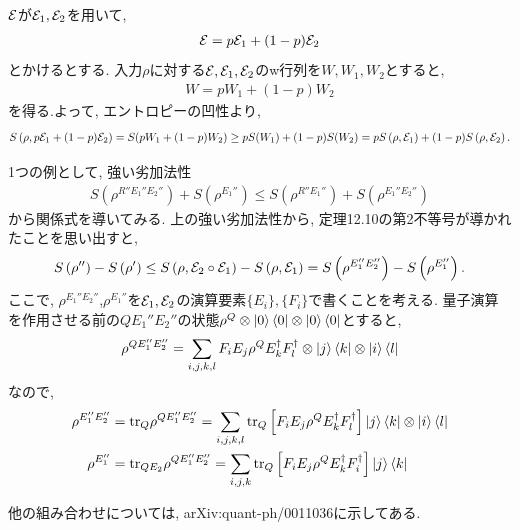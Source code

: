 \begin{ex}
    \label{ex12.12}
\end{ex}

\begin{ex}
    \label{ex12.13}
    $\mathcal{E}$が$\mathcal{E}_1, \mathcal{E}_2$を用いて,
    \begin{align*}
        \mathcal{E} = p \mathcal{E}_1 + ( 1 - p) \mathcal{E}_2
    \end{align*}
    とかけるとする. 入力$\rho$に対する$\mathcal{E}, \mathcal{E}_1, \mathcal{E}_2$のw行列を$W, W_1, W_2$とすると,
    \begin{align*}
        W = p W_1 + (1-p) W_2
    \end{align*}
    を得る.よって, エントロピーの凹性より,
    \begin{align*}
        S \left( \rho, p \mathcal{E}_1 + (1-p)\mathcal{E}_2 \right)
        =
        S(pW_1 + (1-p)W_2 )
        \ge
        p S(W_1) + (1-p) S(W_2)
        =
        p S \left( \rho, \mathcal{E}_1\right) + (1-p) S \left( \rho, \mathcal{E}_2\right).
    \end{align*}
\end{ex}

\begin{ex}
    \label{ex12.14}
\end{ex}

\begin{ex}
    \label{ex12.15}
    1つの例として, 強い劣加法性
    \begin{align*}
        S\left( \rho^{R'' E_1'' E_2''}\right) + S\left( \rho^{E_1''}\right)
        \le S\left( \rho^{R'' E_1''}\right) + S\left( \rho^{E_1'' E_2''}\right)
    \end{align*}
    から関係式を導いてみる.
    上の強い劣加法性から, 定理12.10の第2不等号が導かれたことを思い出すと,
    \begin{align*}
        S\left(\rho''\right) - S\left(\rho'\right)
        \le
        S\left( \rho, \mathcal{E}_2 \circ \mathcal{E}_1\right)
        -
        S\left( \rho, \mathcal{E}_1\right)
        =
        S\left( \rho^{E_1'' E_2''} \right) - S\left( \rho^{E_1''}\right).
    \end{align*}
    ここで, $\rho^{E_1'' E_2''}$,$\rho^{E_1''}$を$\mathcal{E}_1, \mathcal{E}_2$の演算要素$\{ E_i \}, \{ F_i\}$で書くことを考える. 量子演算を作用させる前の$QE_1'' E_2''$の状態$\rho^Q \otimes \ket{0}\bra{0} \otimes \ket{0}\bra{0}$とすると,
    \begin{align*}
        \rho^{Q E_1'' E_2''}
        =
        \sum_{i,j,k,l}  F_i E_j \rho^Q E_k^\dagger F_l^\dagger \otimes \ket{j} \bra{k} \otimes \ket{i}\bra{l}
    \end{align*}
    なので,
    \begin{align*}
        \rho^{E_1'' E_2''}
         & = \mathrm{tr}_Q \rho^{Q E_1'' E_2''}
        = \sum_{i,j,k,l}  \mathrm{tr}_Q \left[ F_i E_j \rho^Q E_k^\dagger F_l^\dagger \right] \ket{j} \bra{k} \otimes \ket{i}\bra{l}
        \\
        \rho^{E_1'' }
         & = \mathrm{tr}_{Q E_2} \rho^{Q E_1'' E_2''}
        =\sum_{i,j,k}  \mathrm{tr}_Q \left[ F_i E_j \rho^Q E_k^\dagger F_i^\dagger \right] \ket{j} \bra{k}
    \end{align*}
    \par
    他の組み合わせについては, arXiv:quant-ph/0011036に示してある.
    \par
\end{ex}

